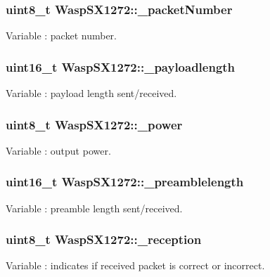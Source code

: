\subsubsection[{\texorpdfstring{\+\_\+packet\+Number}{_packetNumber}}]{\setlength{\rightskip}{0pt plus 5cm}uint8\+\_\+t Wasp\+S\+X1272\+::\+\_\+packet\+Number}\hypertarget{class_wasp_s_x1272_addd7b2be1fcda591c3df8e470b2e82f0}{}\label{class_wasp_s_x1272_addd7b2be1fcda591c3df8e470b2e82f0}
Variable \+: packet number. 
\subsubsection[{\texorpdfstring{\+\_\+payloadlength}{_payloadlength}}]{\setlength{\rightskip}{0pt plus 5cm}uint16\+\_\+t Wasp\+S\+X1272\+::\+\_\+payloadlength}\hypertarget{class_wasp_s_x1272_a5ebbaeb146f744d57cc1e6550efc40e5}{}\label{class_wasp_s_x1272_a5ebbaeb146f744d57cc1e6550efc40e5}
Variable \+: payload length sent/received. 
\subsubsection[{\texorpdfstring{\+\_\+power}{_power}}]{\setlength{\rightskip}{0pt plus 5cm}uint8\+\_\+t Wasp\+S\+X1272\+::\+\_\+power}\hypertarget{class_wasp_s_x1272_a6a1ec7b8bcd4746748b2d6c4a57381be}{}\label{class_wasp_s_x1272_a6a1ec7b8bcd4746748b2d6c4a57381be}
Variable \+: output power. 
\subsubsection[{\texorpdfstring{\+\_\+preamblelength}{_preamblelength}}]{\setlength{\rightskip}{0pt plus 5cm}uint16\+\_\+t Wasp\+S\+X1272\+::\+\_\+preamblelength}\hypertarget{class_wasp_s_x1272_aa7151ad6fd3be83f6f0a748d77194985}{}\label{class_wasp_s_x1272_aa7151ad6fd3be83f6f0a748d77194985}
Variable \+: preamble length sent/received. 
\subsubsection[{\texorpdfstring{\+\_\+reception}{_reception}}]{\setlength{\rightskip}{0pt plus 5cm}uint8\+\_\+t Wasp\+S\+X1272\+::\+\_\+reception}\hypertarget{class_wasp_s_x1272_a4025d018b1337cdd681e6e2a855179d4}{}\label{class_wasp_s_x1272_a4025d018b1337cdd681e6e2a855179d4}
Variable \+: indicates if received packet is correct or incorrect. 
